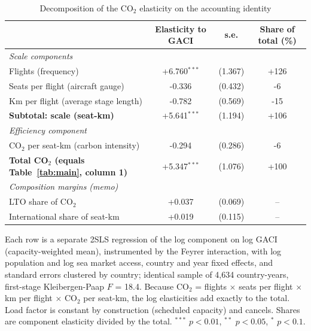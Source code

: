 \begin{table}[htbp]
\centering
\begin{threeparttable}
\caption{Decomposition of the CO$_2$ elasticity on the accounting identity}
\label{tab:decomp}
\footnotesize
\begin{tabular}{lccc}
\toprule
 & Elasticity to GACI & s.e. & Share of total (\%) \\
\midrule
\multicolumn{4}{l}{\textit{Scale components}} \\
  Flights (frequency) & +6.760$^{***}$ & (1.367) & +126 \\
  Seats per flight (aircraft gauge) & -0.336 & (0.432) & -6 \\
  Km per flight (average stage length) & -0.782 & (0.569) & -15 \\
  \textbf{Subtotal: scale (seat-km)} & +5.641$^{***}$ & (1.194) & +106 \\
\multicolumn{4}{l}{\textit{Efficiency component}} \\
  CO$_2$ per seat-km (carbon intensity) & -0.294 & (0.286) & -6 \\
\midrule
  \textbf{Total CO$_2$ (equals Table~\ref{tab:main}, column 1)} & +5.347$^{***}$ & (1.076) & +100 \\
\midrule
\multicolumn{4}{l}{\textit{Composition margins (memo)}} \\
  LTO share of CO$_2$ & +0.037 & (0.069) & -- \\
  International share of seat-km & +0.019 & (0.115) & -- \\
\bottomrule
\end{tabular}
\begin{tablenotes}\footnotesize
\item Each row is a separate 2SLS regression of the log component on log GACI (capacity-weighted mean), instrumented by the Feyrer interaction, with log population and log sea market access, country and year fixed effects, and standard errors clustered by country; identical sample of 4,634 country-years, first-stage Kleibergen-Paap $F$ = 18.4. Because CO$_2$ = flights $\times$ seats per flight $\times$ km per flight $\times$ CO$_2$ per seat-km, the log elasticities add exactly to the total. Load factor is constant by construction (scheduled capacity) and cancels. Shares are component elasticity divided by the total. $^{***}$ $p<0.01$, $^{**}$ $p<0.05$, $^{*}$ $p<0.1$.
\end{tablenotes}
\end{threeparttable}
\end{table}

